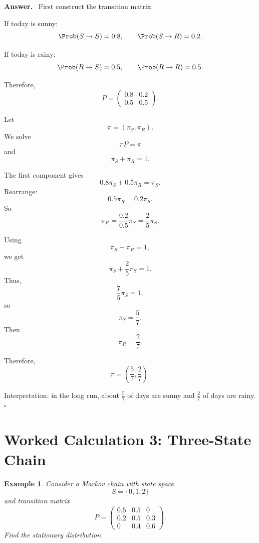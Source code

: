 \documentclass[12pt,a4paper]{article}
\theoremstyle{notestyle}
\newtheorem{example}{Example}
\newenvironment{answer}
{\par\textbf{Answer.}\ }
{\hfill$\square$\par}
\begin{document}
\begin{answer}
First construct the transition matrix.

If today is sunny:
\[
\Prob(S\to S)=0.8,
\qquad
\Prob(S\to R)=0.2.
\]

If today is rainy:
\[
\Prob(R\to S)=0.5,
\qquad
\Prob(R\to R)=0.5.
\]

Therefore,
\[
P=
\begin{pmatrix}
0.8 & 0.2\\
0.5 & 0.5
\end{pmatrix}.
\]

Let
\[
\pi=(\pi_S,\pi_R).
\]
We solve
\[
\pi P=\pi
\]
and
\[
\pi_S+\pi_R=1.
\]

The first component gives
\[
0.8\pi_S+0.5\pi_R=\pi_S.
\]
Rearrange:
\[
0.5\pi_R=0.2\pi_S.
\]
So
\[
\pi_R=\frac{0.2}{0.5}\pi_S=\frac25\pi_S.
\]

Using
\[
\pi_S+\pi_R=1,
\]
we get
\[
\pi_S+\frac25\pi_S=1.
\]
Thus,
\[
\frac75\pi_S=1,
\]
so
\[
\pi_S=\frac57.
\]
Then
\[
\pi_R=\frac27.
\]

Therefore,
\[
\boxed{\pi=\left(\frac57,\frac27\right).}
\]

Interpretation: in the long run, about $\frac57$ of days are sunny and $\frac27$ of days are rainy.
\end{answer}

\section{Worked Calculation 3: Three-State Chain}

\begin{example}
Consider a Markov chain with state space
\[
S=\{0,1,2\}
\]
and transition matrix
\[
P=
\begin{pmatrix}
0.5 & 0.5 & 0\\
0.2 & 0.5 & 0.3\\
0 & 0.4 & 0.6
\end{pmatrix}.
\]
Find the stationary distribution.
\end{example}
\end{document}
